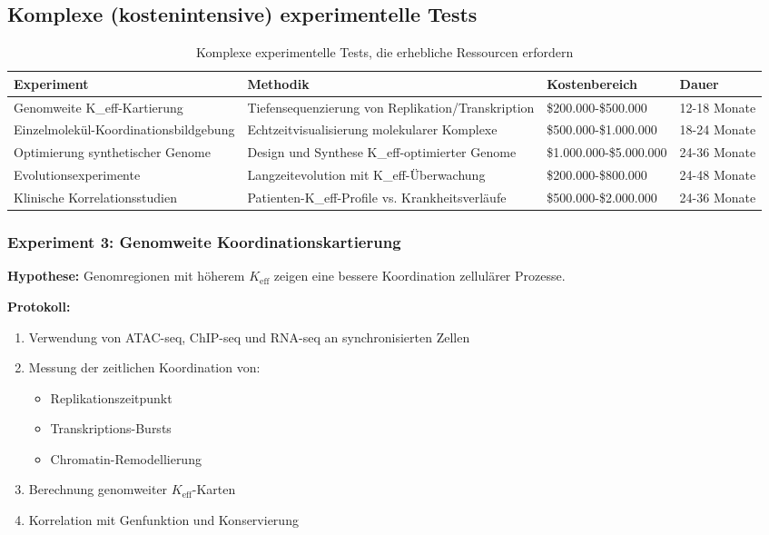 \documentclass[12pt]{article}
\begin{document}
	\subsection{Komplexe (kostenintensive) experimentelle Tests}
	
	\begin{table}[H]
		\centering
		\caption{Komplexe experimentelle Tests, die erhebliche Ressourcen erfordern}
		\begin{tabular}{p{4cm}p{5cm}p{3cm}p{2cm}}
			\toprule
			\textbf{Experiment} & \textbf{Methodik} & \textbf{Kostenbereich} & \textbf{Dauer} \\
			\midrule
			Genomweite K\_eff-Kartierung & Tiefensequenzierung von Replikation/Transkription & \$200.000-\$500.000 & 12-18 Monate \\
			Einzelmolekül-Koordinationsbildgebung & Echtzeitvisualisierung molekularer Komplexe & \$500.000-\$1.000.000 & 18-24 Monate \\
			Optimierung synthetischer Genome & Design und Synthese K\_eff-optimierter Genome & \$1.000.000-\$5.000.000 & 24-36 Monate \\
			Evolutionsexperimente & Langzeitevolution mit K\_eff-Überwachung & \$200.000-\$800.000 & 24-48 Monate \\
			Klinische Korrelationsstudien & Patienten-K\_eff-Profile vs. Krankheitsverläufe & \$500.000-\$2.000.000 & 24-36 Monate \\
			\bottomrule
		\end{tabular}
	\end{table}
	
	\subsubsection{Experiment 3: Genomweite Koordinationskartierung}
	\textbf{Hypothese:} Genomregionen mit höherem $K_{\text{eff}}$ zeigen eine bessere Koordination zellulärer Prozesse.
	
	\textbf{Protokoll:}
	\begin{enumerate}
		\item Verwendung von ATAC-seq, ChIP-seq und RNA-seq an synchronisierten Zellen
		\item Messung der zeitlichen Koordination von:
		\begin{itemize}
			\item Replikationszeitpunkt
			\item Transkriptions-Bursts
			\item Chromatin-Remodellierung
		\end{itemize}
		\item Berechnung genomweiter $K_{\text{eff}}$-Karten
		\item Korrelation mit Genfunktion und Konservierung
	\end{enumerate}
	
\end{document}
